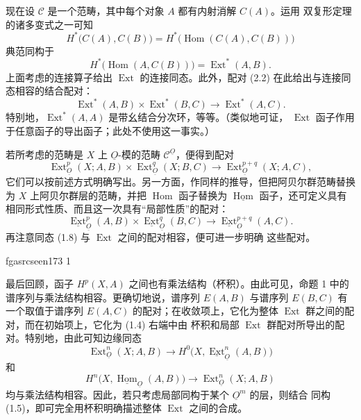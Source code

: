 \documentclass[12pt,twoside,openany]{book}
\numberwithin{equation}{section}
\newcommand{\fgaunitid}{unbound}
\newcommand{\src}[1]{%
  \phantomsection
  \hypertarget{src:\fgaunitid:#1}{}%
  \hypertarget{fga.\fgaunitid.p#1}{}%
  \ifcsname fgasrcseen#1\endcsname\else
    \expandafter\gdef\csname fgasrcseen#1\endcsname{1}%
    \hypertarget{src:#1}{}%
  \fi
  \marginpar{\raggedleft\footnotesize\sffamily #1}%
}
\newcommand{\Osh}{\underline{O}}
\newcommand{\Ccat}{\mathcal C}
\newcommand{\Homsh}{\underline{\operatorname{Hom}}}
\newcommand{\Extsh}{\underline{\operatorname{Ext}}}
\newcommand{\fquote}[1]{“#1”}
\theoremstyle{plain}
\theoremstyle{definition}
\theoremstyle{remark}
\begin{document}
现在设 $\Ccat$ 是一个范畴，其中每个对象 $A$ 都有内射消解 $C(A)$。运用
双复形定理的诸多变式之一可知
\[
  H^{*}\bigl(C(A),C(B)\bigr)
  =H^{*}\bigl(\operatorname{Hom}(C(A),C(B))\bigr)
\]
典范同构于
\[
  H^{*}\bigl(\operatorname{Hom}(A,C(B))\bigr)
  =\operatorname{Ext}^{*}(A,B).
\]
上面考虑的连接算子给出 $\operatorname{Ext}$ 的连接同态。此外，配对 (2.2)
在此给出与连接同态相容的结合配对：
\begin{equation}\tag{2.3}
  \operatorname{Ext}^{*}(A,B)\times\operatorname{Ext}^{*}(B,C)
  \longrightarrow\operatorname{Ext}^{*}(A,C).
\end{equation}
特别地，$\operatorname{Ext}^{*}(A,A)$ 是带幺结合分次环，等等。（类似地可证，
$\operatorname{Ext}$ 函子作用于任意函子的导出函子；此处不使用这一事实。）

若所考虑的范畴是 $X$ 上 $\Osh$-模的范畴 $\Ccat^{\Osh}$，便得到配对
\begin{equation}\tag{2.4}
  \operatorname{Ext}_{\Osh}^{p}(X;A,B)
  \times\operatorname{Ext}_{\Osh}^{q}(X;B,C)
  \longrightarrow\operatorname{Ext}_{\Osh}^{p+q}(X;A,C),
\end{equation}
它们可以按前述方式明确写出。另一方面，作同样的推导，但把阿贝尔群范畴替换为
$X$ 上阿贝尔群层的范畴，并把 $\operatorname{Hom}$ 函子替换为 $\Homsh$
函子，还可定义具有相同形式性质、而且这一次具有\fquote{局部性质}的配对：
\begin{equation}\tag{2.5}
  \Extsh_{\Osh}^{p}(A,B)\times\Extsh_{\Osh}^{q}(B,C)
  \longrightarrow\Extsh_{\Osh}^{p+q}(A,C).
\end{equation}
再注意同态 (1.8) 与 $\operatorname{Ext}$ 之间的配对相容，便可进一步明确
这些配对。

\src{173}
最后回顾，函子 $H^{p}(X,A)$ 之间也有乘法结构（杯积）。由此可见，命题 1
中的谱序列与乘法结构相容。更确切地说，谱序列 $E(A,B)$ 与谱序列 $E(B,C)$
有一个取值于谱序列 $E(A,C)$ 的配对；在收敛项上，它化为整体
$\operatorname{Ext}$ 群之间的配对，而在初始项上，它化为 (1.4) 右端中由
杯积和局部 $\operatorname{Ext}$ 群配对所导出的配对。特别地，由此可知边缘同态
\begin{equation}\tag{2.6}
  \operatorname{Ext}_{\Osh}^{n}(X;A,B)
  \longrightarrow H^{0}\bigl(X,\Extsh_{\Osh}^{n}(A,B)\bigr)
\end{equation}
和
\begin{equation}\tag{2.7}
  H^{n}\bigl(X,\Homsh_{\Osh}(A,B)\bigr)
  \longrightarrow\operatorname{Ext}_{\Osh}^{n}(X;A,B)
\end{equation}
均与乘法结构相容。因此，若只考虑局部同构于某个 $\Osh^{m}$ 的层，则结合
同构 (1.5)，即可完全用杯积明确描述整体 $\operatorname{Ext}$ 之间的合成。
\end{document}

